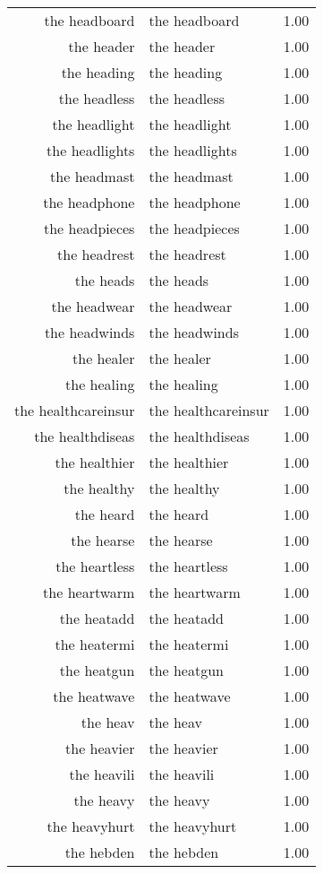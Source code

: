 \begin{table}[ht]
\begin{tabular}{rlr}
  the headboard & the headboard & 1.00 \\ 
  the header & the header & 1.00 \\ 
  the heading & the heading & 1.00 \\ 
  the headless & the headless & 1.00 \\ 
  the headlight & the headlight & 1.00 \\ 
  the headlights & the headlights & 1.00 \\ 
  the headmast & the headmast & 1.00 \\ 
  the headphone & the headphone & 1.00 \\ 
  the headpieces & the headpieces & 1.00 \\ 
  the headrest & the headrest & 1.00 \\ 
  the heads & the heads & 1.00 \\ 
  the headwear & the headwear & 1.00 \\ 
  the headwinds & the headwinds & 1.00 \\ 
  the healer & the healer & 1.00 \\ 
  the healing & the healing & 1.00 \\ 
  the healthcareinsur & the healthcareinsur & 1.00 \\ 
  the healthdiseas & the healthdiseas & 1.00 \\ 
  the healthier & the healthier & 1.00 \\ 
  the healthy & the healthy & 1.00 \\ 
  the heard & the heard & 1.00 \\ 
  the hearse & the hearse & 1.00 \\ 
  the heartless & the heartless & 1.00 \\ 
  the heartwarm & the heartwarm & 1.00 \\ 
  the heatadd & the heatadd & 1.00 \\ 
  the heatermi & the heatermi & 1.00 \\ 
  the heatgun & the heatgun & 1.00 \\ 
  the heatwave & the heatwave & 1.00 \\ 
  the heav & the heav & 1.00 \\ 
  the heavier & the heavier & 1.00 \\ 
  the heavili & the heavili & 1.00 \\ 
  the heavy & the heavy & 1.00 \\ 
  the heavyhurt & the heavyhurt & 1.00 \\ 
  the hebden & the hebden & 1.00 \\ 

\end{tabular}
\end{table}
